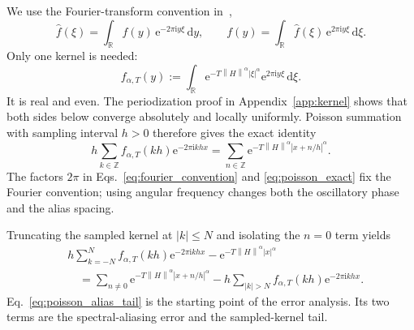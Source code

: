 \documentclass[aps,pra,reprint,floatfix,unsortedaddress,superscriptaddress]{revtex4-2}
\newcommand{\norm}[1]{\left\lVert#1\right\rVert}
\newcommand{\abs}[1]{\left\lvert#1\right\rvert}
\begin{document}
We use the Fourier-transform convention
in~\cite{stein1971introduction,katznelson2004introduction},
\begin{equation}
    \widehat f(\xi)
    =
    \int_{\mathbb R}f(y)\,
    \mathrm e^{-2\pi\mathrm i y\xi}\,\mathrm dy,
    \qquad
    f(y)
    =
    \int_{\mathbb R}\widehat f(\xi)\,
    \mathrm e^{2\pi\mathrm i y\xi}\,\mathrm d\xi.
    \label{eq:fourier_convention}
\end{equation}
Only one kernel is needed:
\begin{equation}
    f_{\alpha,T}(y)
    :=
    \int_{\mathbb R}
    \mathrm e^{-T\norm{H}^{\alpha}\abs{\xi}^{\alpha}}
    \mathrm e^{2\pi\mathrm i y\xi}\,\mathrm d\xi.
    \label{eq:inverse_fourier_kernel}
\end{equation}
It is real and even.  The periodization proof in
Appendix~\ref{app:kernel} shows that both sides below converge
absolutely and locally uniformly.  Poisson summation with sampling
interval $h>0$ therefore gives the exact identity
\begin{equation}
    h\sum_{k\in\mathbb Z}
    f_{\alpha,T}(kh)
    \mathrm e^{-2\pi\mathrm i khx}
    =
    \sum_{n\in\mathbb Z}
    \mathrm e^{-T\norm{H}^{\alpha}
    \abs{x+n/h}^{\alpha}}.
    \label{eq:poisson_exact}
\end{equation}
The factors $2\pi$ in Eqs.~\eqref{eq:fourier_convention} and
\eqref{eq:poisson_exact} fix the Fourier convention; using angular
frequency changes both the oscillatory phase and the alias spacing.

Truncating the sampled kernel at $\abs{k}\leq N$ and isolating the
$n=0$ term yields
\begin{align}
    &h\sum_{k=-N}^{N}
    f_{\alpha,T}(kh)
    \mathrm e^{-2\pi\mathrm i khx}
    -
    \mathrm e^{-T\norm{H}^{\alpha}\abs{x}^{\alpha}}
    \nonumber\\
    &\quad=
    \sum_{n\ne0}
    \mathrm e^{-T\norm{H}^{\alpha}
    \abs{x+n/h}^{\alpha}}
    -
    h\sum_{\abs{k}>N}
    f_{\alpha,T}(kh)
    \mathrm e^{-2\pi\mathrm i khx}.
    \label{eq:poisson_alias_tail}
\end{align}
Eq.~\eqref{eq:poisson_alias_tail} is the starting point of the
error analysis.  Its two terms are the spectral-aliasing error and the
sampled-kernel tail.
\end{document}
